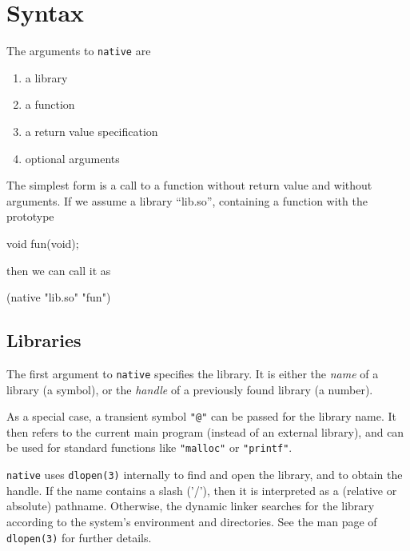
\section{Syntax}
\label{sec:native-syntax}

The arguments to \texttt{native} are

\begin{enumerate}
\item
  a library
\item
  a function
\item
  a return value specification
\item
  optional arguments
\end{enumerate}

The simplest form is a call to a function without return value and
without arguments. If we assume a library ``lib.so'', containing a
function with the prototype

\begin{wideverbatim}
void fun(void);
\end{wideverbatim}

then we can call it as

\begin{wideverbatim}
(native "lib.so" "fun")
\end{wideverbatim}


\subsection{Libraries}
\label{sec:native-syntax}

The first argument to \texttt{native} specifies the library. It is
either the \emph{name} of a library (a symbol), or the \emph{handle} of
a previously found library (a number).

As a special case, a transient symbol \texttt{"@"} can be passed for the
library name. It then refers to the current main program (instead of an
external library), and can be used for standard functions like
\texttt{"malloc"} or \texttt{"printf"}.

\texttt{native} uses \texttt{dlopen(3)} internally to find and open the
library, and to obtain the handle. If the name contains a slash ('/'),
then it is interpreted as a (relative or absolute) pathname. Otherwise,
the dynamic linker searches for the library according to the system's
environment and directories. See the man page of \texttt{dlopen(3)} for
further details.

